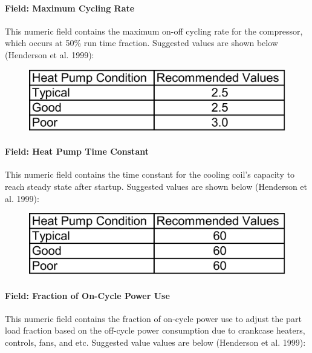 \paragraph{Field: Maximum Cycling Rate}\label{field-maximum-cycling-rate-1-000}

This numeric field contains the maximum on-off cycling rate for the compressor, which occurs at 50\% run time fraction. Suggested values are shown below (Henderson et al. 1999):

\begin{figure}[htbp]
\centering
\includegraphics{media/image305.png}
\caption{}
\end{figure}

\paragraph{Field: Heat Pump Time Constant}\label{field-heat-pump-time-constant-1}

This numeric field contains the time constant for the cooling coil's capacity to reach steady state after startup. Suggested values are shown below (Henderson et al. 1999):

\begin{figure}[htbp]
\centering
\includegraphics{media/image306.png}
\caption{}
\end{figure}

\paragraph{Field: Fraction of On-Cycle Power Use}\label{field-fraction-of-on-cycle-power-use-1}

This numeric field contains the fraction of on-cycle power use to adjust the part load fraction based on the off-cycle power consumption due to crankcase heaters, controls, fans, and etc. Suggested value values are below (Henderson et al. 1999):

